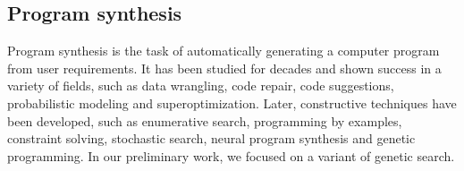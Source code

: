 \documentclass[11pt]{article}
\begin{document}
\subsection{Program synthesis}
Program synthesis is the task of automatically generating a computer program from user requirements. It has been studied for decades and shown success in a variety of fields,
such as data wrangling\cite{inbook}, code repair\cite{d39antoni2016qlose}, code suggestions\cite{10.1145/2594291.2594321}, probabilistic modeling\cite{nori2015efficient} and superoptimization\cite{10.1145/36206.36194}. Later, constructive techniques have been developed, such as enumerative
search\cite{6679385}, programming by examples\cite{inbook}, constraint solving\cite{CSP}, stochastic search\cite{schkufza2012stochastic}, neural program synthesis\cite{parisotto2016neurosymbolic} and genetic programming\cite{Koza92}. In our preliminary
work, we focused on a variant of genetic search.





\end{document}
